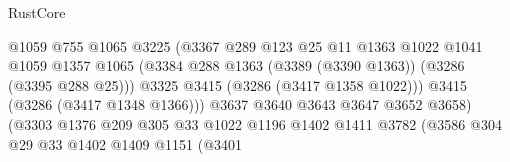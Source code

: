 \begin{lexlean}{RustCore}
\begin{coremodule}
                                              @1059
                                              @755
                                              @1065
                                              @3225
                                              (@3367
                                                @289
                                                @123
                                                @25
                                                @11
                                                @1363
                                                @1022
                                                @1041
                                                @1059
                                                @1357
                                                @1065
                                                (@3384
                                                  @288
                                                  @1363
                                                  (@3389 (@3390 @1363))
                                                  (@3286 (@3395 @288 @25)))
                                                @3325
                                                @3415
                                                (@3286 (@3417 @1358 @1022)))
                                              @3415
                                              (@3286 (@3417 @1348 @1366)))
                                            @3637
                                            @3640
                                            @3643
                                            @3647
                                            @3652
                                            @3658)
                                          (@3303
                                            @1376
                                            @209
                                            @305
                                            @33
                                            @1022
                                            @1196
                                            @1402
                                            @1411
                                            @3782
                                            (@3586
                                              @304
                                              @29
                                              @33
                                              @1402
                                              @1409
                                              @1151
                                              (@3401

\end{coremodule}
\end{lexlean}

